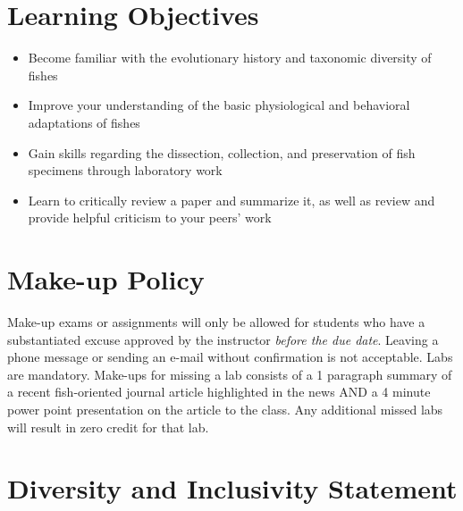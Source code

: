 \documentclass[a4paper]{inzane_syllabus} %
\begin{document}
\vspace{0.5cm}
\section{Learning Objectives}

\begin{itemize}
\item Become familiar with the evolutionary history and taxonomic diversity
  of fishes
\item Improve your understanding of the basic physiological and behavioral
  adaptations of fishes
\item Gain skills regarding the dissection, collection, and preservation of fish
  specimens through laboratory work
\item Learn to critically review a paper and summarize it, as well as review and
  provide helpful criticism to your peers' work
\end{itemize}



\newpage 

\makeSide 

\vspace{0.5cm}
\section{Make-up Policy}

Make-up exams or assignments will only be allowed for students who have a
substantiated excuse approved by the instructor \emph{before the due date}.
Leaving a phone message or sending an e-mail without confirmation is not
acceptable. Labs are mandatory. Make-ups for missing a lab consists of a 1
paragraph summary of a recent fish-oriented journal article highlighted in the
news AND a 4 minute power point presentation on the article to the class. Any
additional missed labs will result in zero credit for that lab.

\vspace{0.5cm}
\section{Diversity and Inclusivity Statement}
\end{document}
